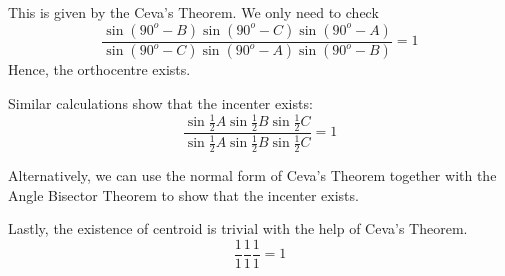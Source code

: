 \documentclass{article}
\theoremstyle{definition}
\begin{document}
This is given by the Ceva's Theorem. We only need to check
	\begin{equation*}
		\frac{\sin(90^o-B)\sin(90^o-C)\sin(90^o-A)}{\sin(90^o-C)\sin(90^o-A)\sin(90^o-B)} = 1
	\end{equation*}
Hence, the orthocentre exists.

Similar calculations show that the incenter exists:
\begin{equation*}
	\frac{\sin \frac{1}{2}A \sin \frac{1}{2}B \sin \frac{1}{2}C}{\sin \frac{1}{2}A \sin \frac{1}{2}B \sin \frac{1}{2}C} = 1
\end{equation*}

Alternatively, we can use the normal form of Ceva's Theorem together with the Angle Bisector Theorem to show that the incenter exists.

Lastly, the existence of centroid is trivial with the help of Ceva's Theorem.
\begin{equation*}
	\frac{1}{1} \frac{1}{1} \frac{1}{1} = 1
\end{equation*}
\end{document}
